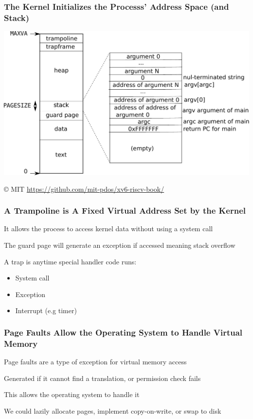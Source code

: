   \begin{frame}
    \frametitle{The Kernel Initializes the Processs' Address Space (and Stack)}

    \begin{center}
      \includegraphics[scale=0.35]{processlayout.pdf}
    \end{center}

    © MIT \url{https://github.com/mit-pdos/xv6-riscv-book/}
  \end{frame}

  \begin{frame}
    \frametitle{A Trampoline is A Fixed Virtual Address Set by the Kernel}

    It allows the process to access kernel data without using
    a system call

    \vspace{2em}

    The guard page will generate an exception if accessed meaning stack overflow

    \vspace{2em}

    A trap is anytime special handler code runs:
    \begin{itemize}
      \item System call
      \item Exception
      \item Interrupt (e.g timer)
    \end{itemize}
  \end{frame}

  \begin{frame}
    \frametitle{Page Faults Allow the Operating System to Handle Virtual Memory}

    Page faults are a type of exception for virtual memory access

    \hspace{2em} Generated if it cannot find a translation, or permission check fails

    \vspace{2em}

    This allows the operating system to handle it

    \hspace{2em} We could lazily allocate pages, implement copy-on-write, or swap to disk
  \end{frame}

